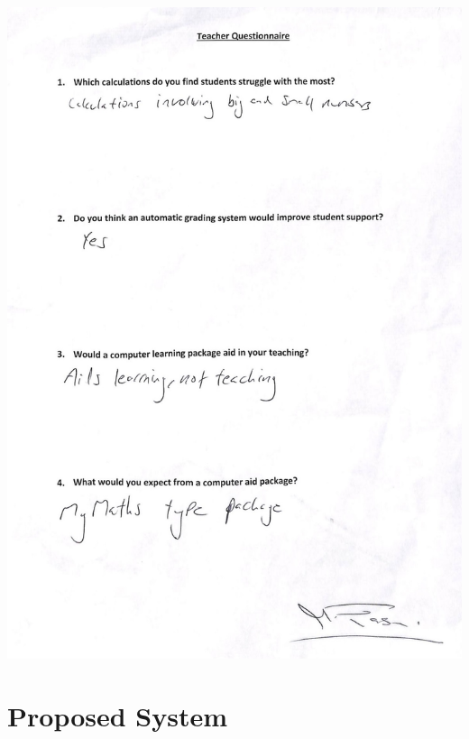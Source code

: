 \documentclass[a4paper,12pt]{report}
\begin{document}
\includegraphics{TeacherQuestionnaire}

\clearpage
\section{Proposed System}        
\end{document}
